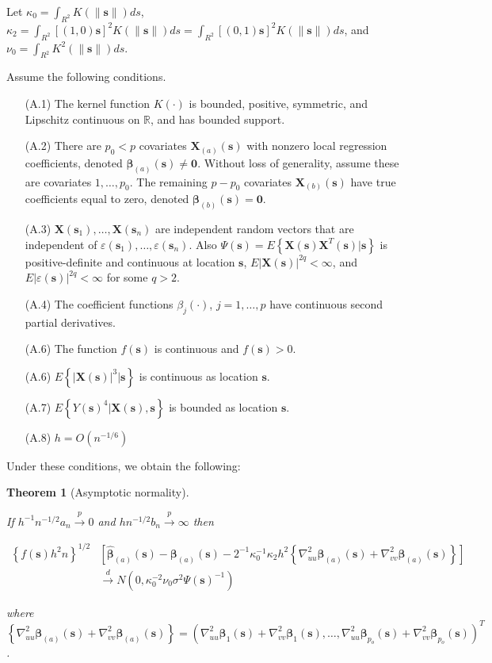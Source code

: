 \documentclass[authoryear,review, 12pt]{elsarticle}
\newtheorem{thm}{Theorem}
\begin{document}
Let $\kappa_{0}=\int_{R^{2}}K(\|\bm{s}\|)ds$, $\kappa_{2}=\int_{R^{2}}[(1,0)\bm{s}]^{2}K(\|\bm{s}\|)ds=\int_{R^{2}}[(0,1)\bm{s}]^{2}K(\|\bm{s}\|)ds$,
and $\nu_{0}=\int_{R^{2}}K^{2}(\|\bm{s}\|)ds$.

Assume the following conditions.
\begin{itemize}
\item[(A.1)] The kernel function $K(\cdot)$ is bounded, positive, symmetric,
and Lipschitz continuous on $\mathbb{R}$, and has bounded support.
\item[(A.2)] There are $p_{0}<p$ covariates $\bm{X}_{(a)}(\bm{s})$ with nonzero
local regression coefficients, denoted $\bm{\beta}_{(a)}(\bm{s})\ne\bm{0}$.
Without loss of generality, assume these are covariates $1,\dots,p_{0}$.
The remaining $p-p_{0}$ covariates $\bm{X}_{(b)}(\bm{s})$ have true
coefficients equal to zero, denoted $\bm{\beta}_{(b)}(\bm{s})=\bm{0}$.
\item[(A.3)] $\bm{X}(\bm{s}_{1}),\dots,\bm{X}(\bm{s}_{n})$ are independent random
vectors that are independent of $\varepsilon(\bm{s}_{1}),\dots,\varepsilon(\bm{s}_{n})$.
Also $\Psi(\bm{s})=E\left\{ \bm{X}(\bm{s})\bm{X}^{T}(\bm{s})|\bm{s}\right\} $
is positive-definite and continuous at location $\bm{s}$, $E\left|\bm{X}(\bm{s})\right|^{2q}<\infty$,
and $E\left|\varepsilon(\bm{s})\right|^{2q}<\infty$ for some $q>2$.
\item[(A.4)] The coefficient functions $ $$\beta_{j}(\cdot)$, $j=1,\dots,p$
have continuous second partial derivatives.
\item[(A.6)] The function $f(\bm{s})$ is continuous and $f(\bm{s})>0$.
\item[(A.6)] $E\left\{ \left|\bm{X}(\bm{s})\right|^{3}|\bm{s}\right\} $ is continuous
as location $\bm{s}$.
\item[(A.7)] $E\left\{ Y(\bm{s})^{4}|\bm{X}(\bm{s}),\bm{s}\right\} $ is bounded
as location $\bm{s}$.
\item[(A.8)] $h=O\left(n^{-1/6}\right)$
\end{itemize}
Under these conditions, we obtain the following:
\begin{thm}[Asymptotic normality]
\label{theorem:normality} 



If $h^{-1}n^{-1/2}a_{n}\xrightarrow{p}0$ and $hn^{-1/2}b_{n}\xrightarrow{p}\infty$
then

\begin{align*}
\left\{ f(\bm{s})h^{2}n\right\} ^{1/2} & \left[\hat{\bm{\beta}}_{(a)}(\bm{s})-\bm{\beta}_{(a)}(\bm{s})-2^{-1}\kappa_{0}^{-1}\kappa_{2}h^{2}\left\{ \nabla_{uu}^{2}\bm{\beta}_{(a)}(\bm{s})+\nabla_{vv}^{2}\bm{\beta}_{(a)}(\bm{s})\right\} \right]\\
 & \xrightarrow{d}N\left(0,\kappa_{0}^{-2}\nu_{0}\sigma^{2}\Psi(\bm{s})^{-1}\right)
\end{align*}


where $\left\{ \nabla_{uu}^{2}\bm{\beta}_{(a)}(\bm{s})+\nabla_{vv}^{2}\bm{\beta}_{(a)}(\bm{s})\right\} =\left(\nabla_{uu}^{2}\bm{\beta}_{1}(\bm{s})+\nabla_{vv}^{2}\bm{\beta}_{1}(\bm{s}),\dots,\nabla_{uu}^{2}\bm{\beta}_{p_{o}}(\bm{s})+\nabla_{vv}^{2}\bm{\beta}_{p_{o}}(\bm{s})\right)^{T}$.
\end{thm}
\end{document}
